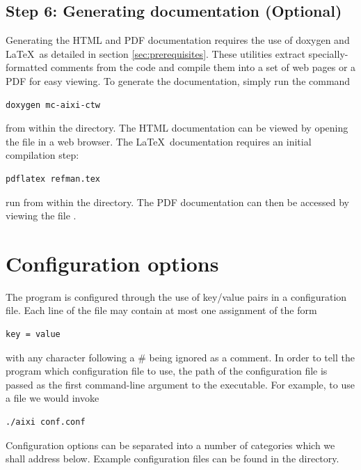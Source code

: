 \documentclass[a4paper,11pt]{article}
\begin{document}
\subsection{Step 6: Generating documentation (Optional)}
Generating the HTML and PDF documentation requires the use of doxygen and \LaTeX~as detailed in section \ref{sec:prerequisites}. These utilities extract specially-formatted comments from the code and compile them into a set of web pages or a PDF for easy viewing. To generate the documentation, simply run the command
\begin{lstlisting}[frame=single]
doxygen mc-aixi-ctw
\end{lstlisting}
from within the  directory. The HTML documentation can be viewed by opening the file  in a web browser. The \LaTeX~documentation requires an initial compilation step:
\begin{lstlisting}[frame=single]
pdflatex refman.tex
\end{lstlisting}
run from within the  directory. The PDF documentation can then be accessed by viewing the file .



\section{Configuration options}
\label{sec:options}
The program is configured through the use of key/value pairs in a configuration file. Each line of the file may contain at most one assignment of the form
\begin{lstlisting}[frame=single]
key = value
\end{lstlisting}
with any character following a \# being ignored as a comment. In order to tell the program which configuration file to use, the path of the configuration file is passed as the first command-line argument to the executable. For example, to use a file  we would invoke
\begin{lstlisting}[frame=single]
./aixi conf.conf
\end{lstlisting}

Configuration options can be separated into a number of categories which we shall address below. Example configuration files can be found in the  directory.
\end{document}
